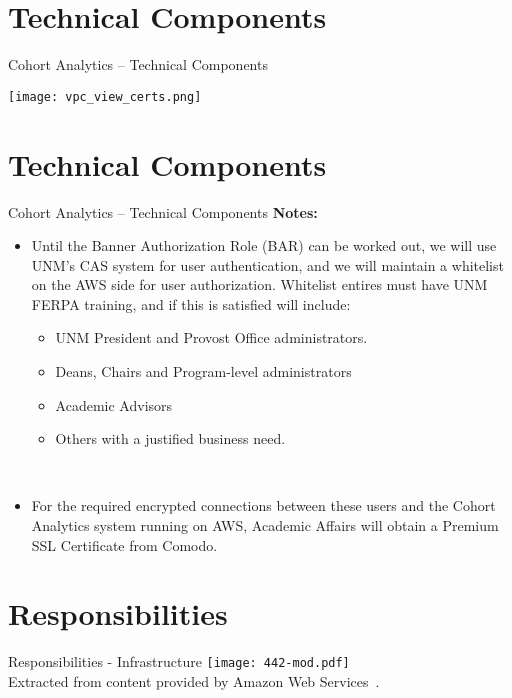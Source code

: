 \documentclass[t,handout]{beamer}   %
\begin{document}
\section{Technical Components}%
\begin{frame}{Cohort Analytics -- Technical Components}
\vspace*{0.25in}
  \centerline{\texttt{[image: vpc\_view\_certs.png]}}
\end{frame}

\section{Technical Components}%
\begin{frame}{Cohort Analytics -- Technical Components}
\vspace*{-0.15in}
\textbf{Notes:}
\begin{itemize}
 \item Until the Banner Authorization Role (BAR) can be worked out, we will use UNM's CAS system for user authentication, and we will maintain a whitelist on the AWS side for user authorization. 
 \pause Whitelist entires must have UNM FERPA training, and if this is satisfied will include:
 \begin{itemize}
  \item UNM President and Provost Office administrators.
  \pause
  \item Deans, Chairs and Program-level administrators
  \pause
  \item Academic Advisors
  \pause
  \item Others with a justified business need.
 \end{itemize}~\\
  \pause
 \item For the required encrypted connections between these users and the Cohort Analytics system running on AWS, Academic Affairs will obtain a Premium SSL Certificate from Comodo.
\end{itemize}
\end{frame}


\section{Responsibilities}%
\begin{frame}{Responsibilities - Infrastructure}
 	\texttt{[image: 442-mod.pdf]} \\
 	{\tiny Extracted from content provided by Amazon Web Services~.}
\end{frame}
\end{document}
